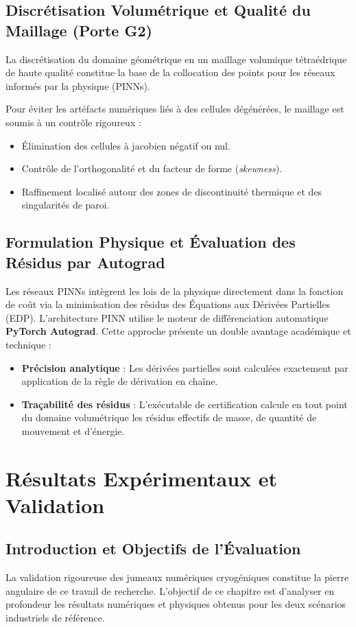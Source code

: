 \documentclass[12pt,a4paper,oneside]{report}
\begin{document}
\section{Discrétisation Volumétrique et Qualité du Maillage (Porte G2)}
La discrétisation du domaine géométrique en un maillage volumique tétraédrique de haute qualité constitue la base de la collocation des points pour les réseaux informés par la physique (PINNs). 

Pour éviter les artéfacts numériques liés à des cellules dégénérées, le maillage est soumis à un contrôle rigoureux :
\begin{itemize}
    \item Élimination des cellules à jacobien négatif ou nul.
    \item Contrôle de l'orthogonalité et du facteur de forme (\textit{skewness}).
    \item Raffinement localisé autour des zones de discontinuité thermique et des singularités de paroi.
\end{itemize}

\section{Formulation Physique et Évaluation des Résidus par Autograd}
Les réseaux PINNs intègrent les lois de la physique directement dans la fonction de coût via la minimisation des résidus des Équations aux Dérivées Partielles (EDP). L'architecture PINN utilise le moteur de différenciation automatique \textbf{PyTorch Autograd}. Cette approche présente un double avantage académique et technique :
\begin{itemize}
    \item \textbf{Précision analytique} : Les dérivées partielles sont calculées exactement par application de la règle de dérivation en chaîne.
    \item \textbf{Traçabilité des résidus} : L'exécutable de certification calcule en tout point du domaine volumétrique les résidus effectifs de masse, de quantité de mouvement et d'énergie.
\end{itemize}

\chapter{Résultats Expérimentaux et Validation}
\section{Introduction et Objectifs de l'Évaluation}
La validation rigoureuse des jumeaux numériques cryogéniques constitue la pierre angulaire de ce travail de recherche. L'objectif de ce chapitre est d'analyser en profondeur les résultats numériques et physiques obtenus pour les deux scénarios industriels de référence.
\end{document}
